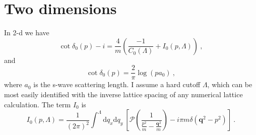 \section{Two dimensions}
In 2-d we have 
\begin{equation}\label{eqn:Q1}
\cot \delta_{0}(p)-i=\frac{4}{m} \left(\frac{-1}{C_{0}(\Lambda)}+I_{0}(p, \Lambda)\right)\ ,
\end{equation}
and
\begin{equation}\label{eqn:Q2}
\cot\delta_0(p)=\frac{2}{\pi}\log(p a_0)\ ,
\end{equation}
where $a_0$ is the s-wave scattering length.  I assume a hard cutoff $\Lambda$, which can be most easily identified with the inverse lattice spacing of any numerical lattice calculation.  The term $I_0$ is
\begin{equation}\label{eqn:I0}
I_0(p,\Lambda)=\frac{1}{(2 \pi)^{2}} \int^{\Lambda} \mathrm{d}q_x\mathrm{d}q_y\ \left[\mathcal{P}\left(\frac{1}{\frac{p^2}{m}-\frac{\bm{q}^{2}}{m}}\right)-i \pi m\delta(\bm q^2-p^2)\right]\ .
\end{equation}

